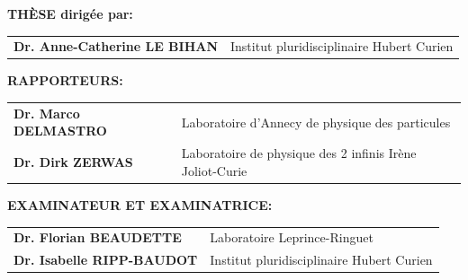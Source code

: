 \begin{titlepage}
\begin{center}
      \end{center}
      
       \small
      
       \vspace*{0.2cm}
      
       {\large \textbf{THÈSE dirigée par:}} %
      
       \vspace*{0.5cm}
      
       \setlength{\tabcolsep}{0.5cm}
       \begin{tabular}{ll}
             \textbf{Dr. Anne-Catherine LE BIHAN}          & Institut pluridisciplinaire Hubert Curien\\
       \end{tabular}
      
       \hrulefill
      
       \vspace*{0.5cm}
      
      
      
      
             {\large \textbf{RAPPORTEURS:}} %
      
             \vspace*{0.5cm}
      
             \setlength{\tabcolsep}{.5cm}
             \begin{tabular}{ll}
                   \textbf{Dr. Marco DELMASTRO} & Laboratoire d'Annecy de physique des particules\\
                   \textbf{Dr. Dirk ZERWAS} & Laboratoire de physique des 2 infinis Irène Joliot-Curie \\
             \end{tabular}
      
             \vspace*{0.8cm}
      
             {\large \textbf{EXAMINATEUR ET EXAMINATRICE:}} %
      
             \vspace*{0.5cm}
      
             \setlength{\tabcolsep}{0.5cm}
             \begin{tabular}{ll}
                  \textbf{Dr. Florian BEAUDETTE}          &  Laboratoire Leprince-Ringuet\\
                  \textbf{Dr. Isabelle RIPP-BAUDOT}          & Institut pluridisciplinaire Hubert Curien\\

             \end{tabular}
      
      
      
      \end{titlepage}